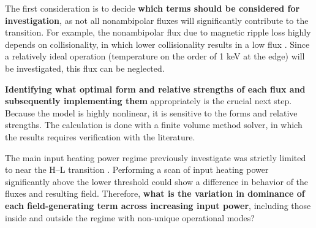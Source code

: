 The first consideration is to decide \textbf{which terms should be considered for investigation}, as not all nonambipolar fluxes will significantly contribute to the transition.
For example, the nonambipolar flux due to magnetic ripple loss highly depends on collisionality, in which lower collisionality results in a low flux \cite{stringer_effect_1972}.
Since a relatively ideal operation (temperature on the order of 1 keV at the edge) will be investigated, this flux can be neglected.

\textbf{Identifying what optimal form and relative strengths of each flux and subsequently implementing them} appropriately is the crucial next step.
Because the model is highly nonlinear, it is sensitive to the forms and relative strengths.
The calculation is done with a finite volume method solver, in which the results requires verification with the literature.

The main input heating power regime previously investigate was strictly limited to near the H--L transition \cite{staps_backstepping_2017}.
Performing a scan of input heating power significantly above the lower threshold could show a difference in behavior of the fluxes and resulting field.
Therefore, \textbf{what is the variation in dominance of each field-generating term across increasing input power}, including those inside and outside the regime with non-unique operational modes?

